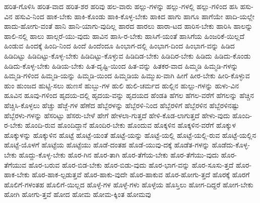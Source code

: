 {ಹರಿತ-ಗೊಳಿಸಿ
ಹರಿತ-ವಾದ
ಹರಿತ-ಶರ
ಹರಿವು
ಹಲ-ವಾರು
ಹಲ್ಲು-ಗಳನ್ನು
ಹಲ್ಲು-ಗಳಲ್ಲಿ
ಹಲ್ಲು-ಗಳಿಂದ
ಹಸಿ
ಹಸು-ವಿನ
ಹಸುವಿ-ನಿಂದ
ಹಾಕ-ಬೇಕು
ಹಾಕಿ-ಕೊಂಡು
ಹಾಕಿ-ಕೊಳ್ಳ-ಬೇಕು
ಹಾಕಿದ
ಹಾಗು
ಹಾಗೂ
ಹಾಗೆಯೇ
ಹಾದಿ-ಯಲ್ಲೇ
ಹಾದು-ಹೋಗು-ವಂತೆ
ಹಾನಿ
ಹಾನಿ-ಯಾಗು-ವುದಿಲ್ಲ
ಹಾರದ
ಹಾರಲು
ಹಾರಾ-ಟದ
ಹಾರಿಸ-ಬೇಕು
ಹಾರಿಸಿ
ಹಾಲನ್ನು
ಹಾಲಿ-ನಲ್ಲಿ
ಹಾಲು
ಹಾಲ್ಗರೆ-ಯು-ವುದು
ಹಾವಿನ
ಹಾಸಿ-ರ-ಬೇಕು
ಹಾಸಿಗೆ-ಯಂತೆ
ಹಾಸಿಗೆಯ
ಹಿಂಜರಿಕೆ-ಯಿಲ್ಲದೆ
ಹಿಂಡುವ
ಹಿಂದಕ್ಕೆ
ಹಿಂದಿ-ನಿಂದ
ಹಿಂದೆ
ಹಿಂದೆಂದೂ
ಹಿಂಭಾಗ-ದಲ್ಲಿ
ಹಿಂಭಾಗ-ದಿಂದ
ಹಿಂಭಾಗ-ವನ್ನು
ಹಿಡಿದ
ಹಿಡಿದಿಟ್ಟು
ಹಿಡಿದಿಟ್ಟು-ಕೊಳ್ಳ-ಬೇಕು
ಹಿಡಿದಿಟ್ಟು-ಕೊಳ್ಳುವ
ಹಿಡಿದಿಡ-ಬೇಕು
ಹಿಡಿದಿರ-ಬೇಕು
ಹಿಡಿದು
ಹಿಡಿದು-ಕೊಂಡು
ಹಿಡಿದು-ಕೊಳ್ಳ-ಬೇಕು
ಹಿಡಿಯ-ಬೇಕು
ಹಿತ-ದೃಷ್ಟಿ-ಯಿಂದ
ಹಿತ-ವನ್ನು
ಹಿತಕರ-ವಾದ
ಹಿಮ್ಮಡಿ
ಹಿಮ್ಮಡಿ-ಗಳನ್ನು
ಹಿಮ್ಮಡಿ-ಗಳಿಂದ
ಹಿಮ್ಮಡಿ-ಯನ್ನು
ಹಿಮ್ಮಡಿ-ಯಿಂದ
ಹಿಮ್ಮಡಿಯ
ಹಿಮ್ಮುಖ-ವಾಗಿ
ಹೀಗೆ
ಹೀರ-ಬೇಕು
ಹೀರಿ-ಕೊಳ್ಳುವ
ಹುಂ
ಹುಂಜದ
ಹುಟ್ಟಿ-ಸಲು
ಹುಣಸೆ
ಹುಬ್ಬು-ಗಳ
ಹುಲಿ
ಹುಲಿ-ಚರ್ಮದ
ಹುಲ್ಲಿನ
ಹುಲ್ಲು-ಗಳನ್ನು
ಹುಳು-ವಿನ
ಹೂವಿನ
ಹೂವು-ಗಳಿಂದ
ಹೃದಯ-ದಲ್ಲಿ
ಹೃದಯ-ವನ್ನು
ಹೃದಯದ
ಹೆಂಡತಿ
ಹೆಗಲ
ಹೆಗಲ-ವರೆಗೆ
ಹೆಗಲನ್ನು
ಹೆಚ್ಚಿನ
ಹೆಚ್ಚಿಸಿ-ಕೊಳ್ಳಲು
ಹೆಚ್ಚು
ಹೆಜ್ಜೆ-ಗಳ
ಹೆಣೆದ
ಹೆಬ್ಬೆರಳನ್ನು
ಹೆಬ್ಬೆರಳಿ-ನಿಂದ
ಹೆಬ್ಬೆರಳಿಗೆ
ಹೆಬ್ಬೆರಳಿನ
ಹೆಬ್ಬೆರಳಿನಷ್ಟು
ಹೆಬ್ಬೆರಳು-ಗಳನ್ನು
ಹೆಸರಿಟ್ಟು
ಹೆಸರು-ಬೇಳೆ
ಹೇಗೆ
ಹೇಳಲಾ-ಗುತ್ತದೆ
ಹೇಳಿ-ಕೊಡ-ಲಾಗುತ್ತದೆ
ಹೇಳು-ವುದು
ಹೊಂದಿ-ರ-ಬೇಕು
ಹೊಂದಿ-ರುವ
ಹೊಂದಿದ್ದಾನೆ
ಹೊಂದಿರ-ಬೇಕು
ಹೊಂದುವ
ಹೊಕ್ಕಳಿನ
ಹೊಕ್ಕಳಿನ-ವರೆಗೆ
ಹೊಕ್ಕುಳ
ಹೊಕ್ಕುಳನ್ನು
ಹೊಕ್ಕುಳಿನ
ಹೊಟ್ಟೆ
ಹೊಟ್ಟೆ-ಯಂತೆ
ಹೊಟ್ಟೆ-ಯನ್ನು
ಹೊಟ್ಟೆ-ಯಲ್ಲಿ
ಹೊಟ್ಟೆ-ಯಲ್ಲಿ-ರುವ
ಹೊಟ್ಟೆ-ಯಲ್ಲಿನ
ಹೊಟ್ಟೆ-ಯೊಳಗೆ
ಹೊಟ್ಟೆಯ
ಹೊಟ್ಟೆಯು
ಹೊಡೆ-ದಂತಹ
ಹೊಡೆ-ಯುವು-ದಕ್ಕೆ
ಹೊಡೆತ-ಗಳನ್ನು
ಹೊಡೆದು-ಕೊಳ್ಳ-ಬೇಕು
ಹೊದ್ದು-ಕೊಳ್ಳ-ಬೇಕು
ಹೊರ-ಗಿನ
ಹೊರ-ತಾಗಿ
ಹೊರ-ತೆಗೆಯ-ಬೇಕು
ಹೊರ-ತೆಗೆಯು-ವುದು
ಹೊರ-ತೆಗೆಯುವ
ಹೊರ-ಬರುವ
ಹೊರ-ಬಿಡ-ಬೇಕು
ಹೊರ-ಬಿಡು-ವುದು
ಹೊರ-ಭಾಗ-ವನ್ನು
ಹೊರ-ಸೂಸು-ತ್ತದೆ
ಹೊರ-ಹಾಕ-ಬೇಕು
ಹೊರ-ಹಾಕ-ಲ್ಪಡುತ್ತವೆ
ಹೊರ-ಹಾಕು-ವುದೇ
ಹೊರ-ಹಾಕುವ
ಹೊರ-ಹೋಗು-ತ್ತದೆ
ಹೊರಕ್ಕೆ
ಹೊರಗೆ
ಹೊಲಿಗೆ-ಗಳಂತಹ
ಹೊಲಿಗೆ-ಯಿಲ್ಲದ
ಹೊಳ್ಳೆ-ಗಳ
ಹೊಳ್ಳೆ-ಗಳು
ಹೊಳ್ಳೆಯ
ಹೊಸ್ತಿಲು
ಹೋಗ-ದಿದ್ದರೆ
ಹೋಗ-ಬೇಕು
ಹೋಗಿ
ಹೋಗು-ತ್ತವೆ
ಹೋದ
ಹೋಮ
ಹೋಮ-ಕ್ಕಿಂತ
ಹೋಮವು
}
